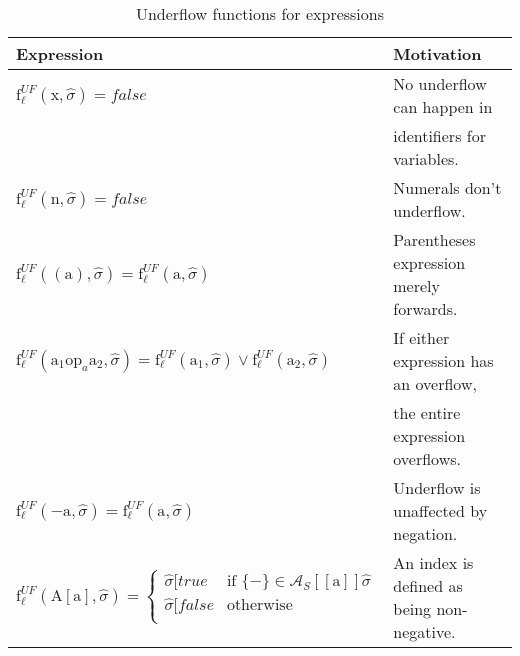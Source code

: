 \begin{table}[h]
\begin{tabular}{| l | l |}
  \hline
  Expression & Motivation\\
  \hline
  \hline
  $\text{f}_\ell^{UF} (\text{x},\widehat{\sigma}) = false $ & No underflow can happen in \\ 
                                                            & identifiers for variables.\\
  \hline
  $\text{f}_\ell^{UF} (\text{n},\widehat{\sigma}) = false $ & Numerals don't underflow.\\
  \hline
  $\text{f}_\ell^{UF} ((\text{a}),\widehat{\sigma}) = \text{f}_\ell^{UF} (\text{a},\widehat{\sigma}) $ & Parentheses expression merely forwards.\\
  \hline
  $\text{f}_\ell^{UF} (\text{a}_1 \text{op}_a \text{a}_2, \widehat{\sigma}) = \text{f}_\ell^{UF} (\text{a}_1,\widehat{\sigma}) \vee \text{f}_\ell^{UF} (\text{a}_2,\widehat{\sigma}) $ & If either expression has an overflow,\\
                                & the entire expression overflows.\\
  \hline
  $\text{f}_\ell^{UF} (-\text{a},\widehat{\sigma}) = \text{f}_\ell^{UF} (\text{a},\widehat{\sigma}) $ & Underflow is unaffected by negation.\\
  \hline
  $\text{f}_\ell^{UF} (\text{A}[\text{a}],\widehat{\sigma}) = 
     \begin{cases} 
        \widehat{\sigma}[true   & \text{if } \{-\} \in \mathcal{A}_S [\![\text{a}]\!]\widehat{\sigma}\\
        \widehat{\sigma}[false  & \text{otherwise} \\
     \end{cases}
   $ & An index is defined as being non-negative.\\
  \hline
\end{tabular}
\centering
\caption{Underflow functions for expressions}
\label{table:underflow_functions_expressions}
\end{table}


